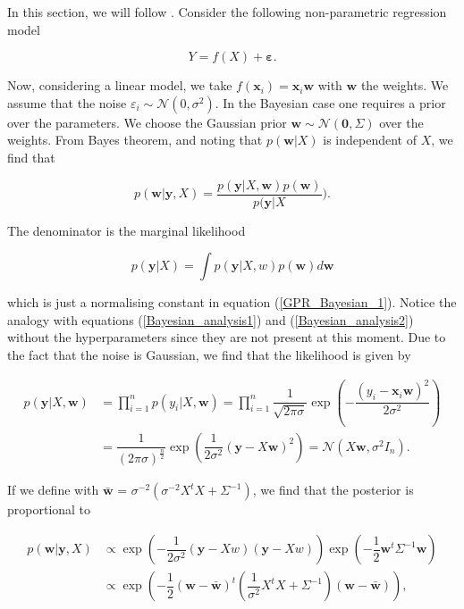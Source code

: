 \documentclass[12pt,a4paper,oneside]{book}
\begin{document}
In this section, we will follow \cite{GPRbook}. Consider the following non-parametric regression model

\begin{equation}\label{GPR_Bayesian_5}
Y = f(X) + \bm{\varepsilon}.
\end{equation}

Now, considering a linear model, we take $f(\bm{x}_i) = \bm{x}_i \bm{w}$ with $\bm{w}$ the weights. We assume that the noise $\varepsilon_i \sim \mathcal{N}(0,\sigma^2)$. In the Bayesian case one requires a prior over the parameters. We choose the Gaussian prior $\bm{w} \sim \mathcal{N}(\bm{0},\Sigma)$ over the weights. From Bayes theorem, and noting that $p(\bm{w}|X)$ is independent of $X$, we find that 

\begin{equation}\label{GPR_Bayesian_1}
p(\bm{w}|\bm{y},X) = \dfrac{p(\bm{y}|X,\bm{w}) p(\bm{w})}{p(\bm{y} | X}).
\end{equation}

The denominator is the marginal likelihood 

\begin{equation}
p(\bm{y}|X) = \int p(\bm{y}|X,w)p(\bm{w})d\bm{w}
\end{equation}

which is just a normalising constant in equation (\ref{GPR_Bayesian_1}). Notice the analogy with equations (\ref{Bayesian_analysis1}) and (\ref{Bayesian_analysis2}) without the  hyperparameters since they are not present at this moment.   Due to the fact that the noise is Gaussian, we find that the likelihood is given by 

\begin{align}\label{GPR_Bayesian_4}
p(\bm{y}|X,\bm{w}) &= \prod_{i=1}^{n} p(y_i|X, \bm{w}) = \prod_{i=1}^{n} \dfrac{1}{\sqrt{2 \pi \sigma}} \exp\left(-\dfrac{(y_i - \bm{x}_i \bm{w})^2}{2 \sigma^2} \right) \nonumber \\ 
&= \dfrac{1}{(2 \pi \sigma)^{\frac{n}{2}}} \exp\left(\dfrac{1}{2 \sigma^2} (\bm{y} - X \bm{w} )^2 \right) = \mathcal{N}(X \bm{w},\sigma^2 I_n).
\end{align}

If we define with $ \bar{\bm{w}}$ = $\sigma^{-2}(\sigma^{-2} X^tX + \Sigma^{-1})$, we find that the posterior is proportional to 

\begin{align}
p(\bm{w}|\bm{y},X) &\propto \exp\left(- \dfrac{1}{2 \sigma^2}(\bm{y} - X w)(\bm{y} - X w) \right) \exp \left(- \dfrac{1}{2} \bm{w}^t \Sigma^{-1} \bm{w} \right) \nonumber \\
&\propto \exp \left(- \dfrac{1}{2}(\bm{w} - \bar{\bm{w}})^t \left( \dfrac{1}{\sigma^2} X^t X + \Sigma^{-1} \right) (\bm{w} - \bar{\bm{w}}) \right),
\end{align}
\end{document}

